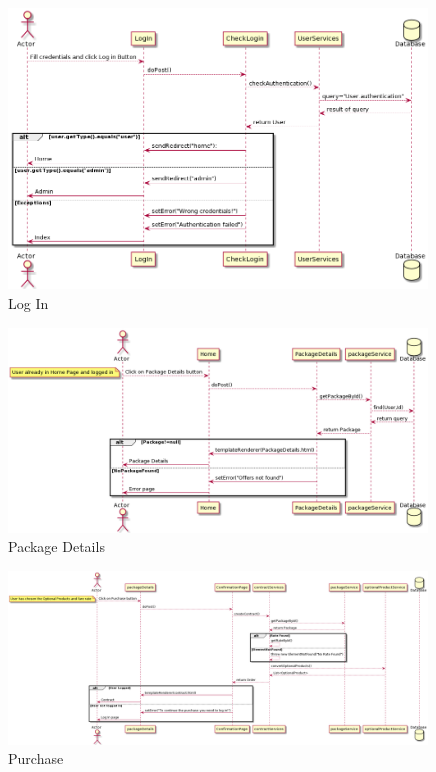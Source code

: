 \documentclass{article}
\begin{document}
\begin{figure}[hbt!]
\centering
\includegraphics[width=0.99\textwidth]{LogIn.png}
\caption{Log In}
\end{figure}

\newpage
\begin{figure}[hbt!]
\centering
\includegraphics[width=0.99\textwidth]{PackDetails.png}
\caption{Package Details}
\end{figure}

\begin{figure}[hbt!]
\centering
\includegraphics[width=0.99\textwidth]{Buy.png}
\caption{Purchase}
\end{figure}
\end{document}
